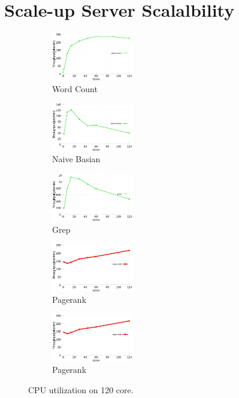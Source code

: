 \section{Scale-up Server Scalalbility}


\begin{figure}[tb]
    \centering
    \begin{subfigure}[b]{0.20\textwidth}
        \includegraphics[width=1.4in]{graph/wc.eps}
        \caption{Word Count}
    \end{subfigure}%
    \begin{subfigure}[b]{0.20\textwidth}
        \includegraphics[width=1.4in]{graph/nb.eps}
        \caption{Naive Basian}
    \end{subfigure}%
    \begin{subfigure}[b]{0.20\textwidth}
        \includegraphics[width=1.4in]{graph/grep.eps}
        \caption{Grep}
    \end{subfigure}%
        \begin{subfigure}[b]{0.20\textwidth}
        \includegraphics[width=1.4in]{graph/pagerank.eps}
        \caption{Pagerank}
    \end{subfigure}%
        \begin{subfigure}[b]{0.20\textwidth}
        \includegraphics[width=1.4in]{graph/pagerank.eps}
        \caption{Pagerank}
    \end{subfigure}
    \caption{CPU utilization on 120 core.}
    \label{fig:utilization}
\end{figure}



